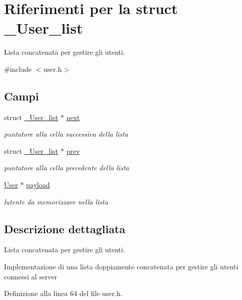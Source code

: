\hypertarget{struct__User__list}{}\section{Riferimenti per la struct \+\_\+\+User\+\_\+list}
\label{struct__User__list}


Lista concatenata per gestire gli utenti.  




{\ttfamily \#include $<$user.\+h$>$}

\subsection*{Campi}
\begin{DoxyCompactItemize}
\item 
struct \hyperlink{struct__User__list}{\+\_\+\+User\+\_\+list} $\ast$ \hyperlink{struct__User__list_a7bcce2696ed06ecd665b624ca9413620}{next}
\begin{DoxyCompactList}\small\item\em puntatore alla cella successiva della lista \end{DoxyCompactList}\item 
struct \hyperlink{struct__User__list}{\+\_\+\+User\+\_\+list} $\ast$ \hyperlink{struct__User__list_aab81902c179f0f2d16d7f90396f1f030}{prev}
\begin{DoxyCompactList}\small\item\em puntatore alla cella precedente della lista \end{DoxyCompactList}\item 
\hyperlink{structUser}{User} $\ast$ \hyperlink{struct__User__list_a9c6cbd743c8c9ec40a0372615c55fce2}{payload}
\begin{DoxyCompactList}\small\item\em l\textquotesingle{}utente da memorizzare nella lista \end{DoxyCompactList}\end{DoxyCompactItemize}


\subsection{Descrizione dettagliata}
Lista concatenata per gestire gli utenti. 

Implementazione di una lista doppiamente concatenata per gestire gli utenti connessi al server 

Definizione alla linea 64 del file user.\+h.



